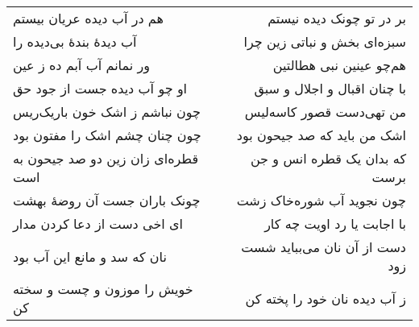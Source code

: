\begin{center}
\begin{longtable}{l p{0.5cm} r}
\\
هم در آب دیده عریان بیستم
&&
بر در تو چونک دیده نیستم
\\
آب دیدهٔ بندهٔ بی‌دیده را
&&
سبزه‌ای بخش و نباتی زین چرا
\\
ور نمانم آب آبم ده ز عین
&&
هم‌چو عینین نبی هطالتین
\\
او چو آب دیده جست از جود حق
&&
با چنان اقبال و اجلال و سبق
\\
چون نباشم ز اشک خون باریک‌ریس
&&
من تهی‌دست قصور کاسه‌لیس
\\
چون چنان چشم اشک را مفتون بود
&&
اشک من باید که صد جیحون بود
\\
قطره‌ای زان زین دو صد جیحون به است
&&
که بدان یک قطره انس و جن برست
\\
چونک باران جست آن روضهٔ بهشت
&&
چون نجوید آب شوره‌خاک زشت
\\
ای اخی دست از دعا کردن مدار
&&
با اجابت یا رد اویت چه کار
\\
نان که سد و مانع این آب بود
&&
دست از آن نان می‌بباید شست زود
\\
خویش را موزون و چست و سخته کن
&&
ز آب دیده نان خود را پخته کن
\\
\end{longtable}
\end{center}
